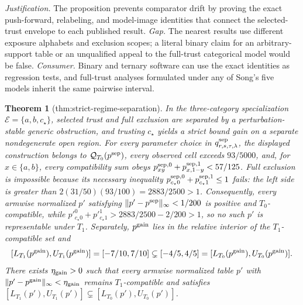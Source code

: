 \documentclass{article}
\newtheorem{theorem}{Theorem}
\begin{document}
\par\smallskip\noindent \textit{Justification.} The proposition prevents comparator drift by proving the exact push-forward, relabeling, and model-image identities that connect the selected-trust envelope to each published result. \textit{Gap.} The nearest results use different exposure alphabets and exclusion scopes; a literal binary claim for an arbitrary-support table or an unqualified appeal to the full-trust categorical model would be false. \textit{Consumer.} Binary and ternary software can use the exact identities as regression tests, and full-trust analyses formulated under any of Song's five models inherit the same pairwise interval.

\begin{theorem}[thm:strict-regime-separation]\label{thm:strict-regime-separation}
In the three-category specialization \(\mathcal E=\{a,b,c_\star\}\), selected trust and full exclusion are separated by a perturbation-stable generic obstruction, and trusting \(c_\star\) yields a strict bound gain on a separate nondegenerate open region. For every parameter choice in \(q^{\rm sep}_{r,s,\tau,\lambda}\), the displayed construction belongs to \(\mathcal Q_{T_0}(p^{\rm sep})\), every observed cell exceeds \(93/5000\), and, for \(x\in\{a,b\}\), every compatibility sum obeys \(p^{{\rm sep},0}_{xy}+p^{{\rm sep},1}_{x,1-y}<57/125\). Full exclusion is impossible because its necessary inequality \(p^{{\rm sep},0}_{c_\star0}+p^{{\rm sep},1}_{c_\star1}\leq1\) fails: the left side is greater than \(2(31/50)(93/100)=2883/2500>1\). Consequently, every armwise normalized \(p'\) satisfying \(\lVert p'-p^{\rm sep}\rVert_\infty<1/200\) is positive and \(T_0\)-compatible, while \(p'^0_{c_\star0}+p'^1_{c_\star1}>2883/2500-2/200>1\), so no such \(p'\) is representable under \(T_1\). Separately, \(p^{\rm gain}\) lies in the relative interior of the \(T_1\)-compatible set and \[ [L_{T_1}(p^{\rm gain}),U_{T_1}(p^{\rm gain})]=[-7/10,7/10]\subsetneq[-4/5,4/5]=[L_{T_0}(p^{\rm gain}),U_{T_0}(p^{\rm gain})]. \] There exists \(\eta_{\rm gain}>0\) such that every armwise normalized table \(p'\) with \(\lVert p'-p^{\rm gain}\rVert_\infty<\eta_{\rm gain}\) remains \(T_1\)-compatible and satisfies \([L_{T_1}(p'),U_{T_1}(p')]\subsetneq[L_{T_0}(p'),U_{T_0}(p')]\).
\end{theorem}
\end{document}
